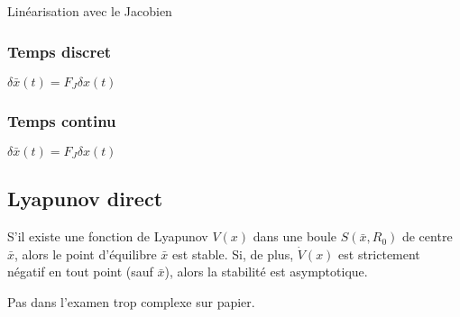 \documentclass[resume]{subfiles}
\begin{document}
 Linéarisation avec le Jacobien

\subsubsection{Temps discret}

$\delta \bar{x}(t) = F_J \delta x(t)$ 

\subsubsection{Temps continu}

$\delta\bar{x}(t) = F_J\delta x(t)$ 

\subsection{Lyapunov direct}

S'il existe une fonction de Lyapunov $V(x)$ dans une boule $S(\bar{x},R_0)$ de centre $\bar{x}$, alors le point d'équilibre $\bar{x}$ est stable. Si, de plus, $\dot{V}(x)$ est strictement négatif en tout point (sauf $\bar{x}$), alors la stabilité est asymptotique.  

Pas dans l'examen trop complexe sur papier.
\end{document}
